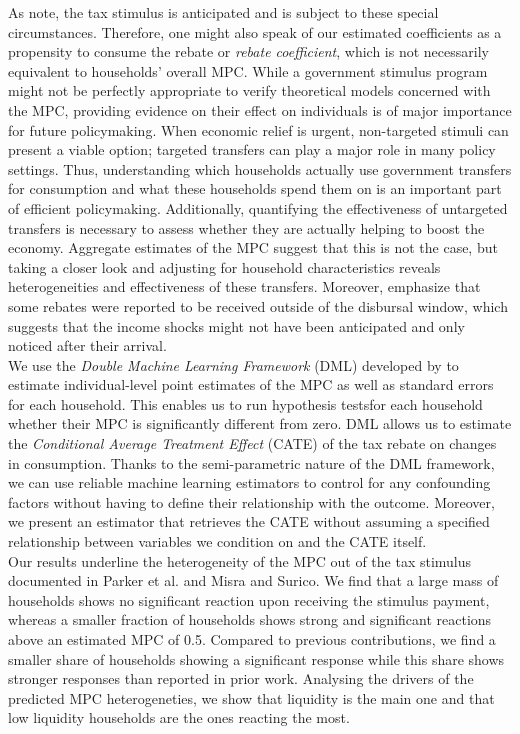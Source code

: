 As \cite{kaplanviolante_2014} note, the tax stimulus is anticipated and is subject to these special circumstances. Therefore, one might also speak of our estimated coefficients as a propensity to consume the rebate or \textit{rebate coefficient}, which is not necessarily equivalent to households' overall MPC. While a government stimulus program might not be perfectly appropriate to verify theoretical models concerned with the MPC, providing evidence on their effect on individuals is of major importance for future policymaking. When economic relief is urgent, non-targeted stimuli can present a viable option; targeted transfers can play a major role in many policy settings. Thus, understanding which households actually use government transfers for consumption and what these households spend them on is an important part of efficient policymaking. Additionally, quantifying the effectiveness of untargeted transfers is necessary to assess whether they are actually helping to boost the economy. Aggregate estimates of the MPC suggest that this is not the case, but taking a closer look and adjusting for household characteristics reveals heterogeneities and effectiveness of these transfers. Moreover, \cite{parkeretal_2013} emphasize that some rebates were reported to be received outside of the disbursal window, which suggests that the income shocks might not have been anticipated and only noticed after their arrival. \\ 
We use the \textit{Double Machine Learning Framework} (DML) developed by \cite{DML2017} to estimate individual-level point estimates of the MPC as well as standard errors for each household. This enables us to run hypothesis testsfor each household whether their MPC is significantly different from zero. DML allows us to estimate the \textit{Conditional Average Treatment Effect} (CATE) of the tax rebate on changes in consumption. Thanks to the semi-parametric nature of the DML framework, we can use reliable machine learning estimators to control for any confounding factors without having to define their relationship with the outcome. Moreover, we present an estimator that retrieves the CATE without assuming a specified relationship between variables we condition on and the CATE itself. \\
Our results underline the heterogeneity of the MPC out of the tax stimulus documented in Parker et al. and Misra and Surico. We find that a large mass of households shows no significant reaction upon receiving the stimulus payment, whereas a smaller fraction of households shows strong and significant reactions above an estimated MPC of 0.5. Compared to previous contributions, we find a smaller share of households showing a significant response while this share shows stronger responses than reported in prior work. Analysing the drivers of the predicted MPC heterogeneties, we show that liquidity is the main one and that low liquidity households are the ones reacting the most. \\
